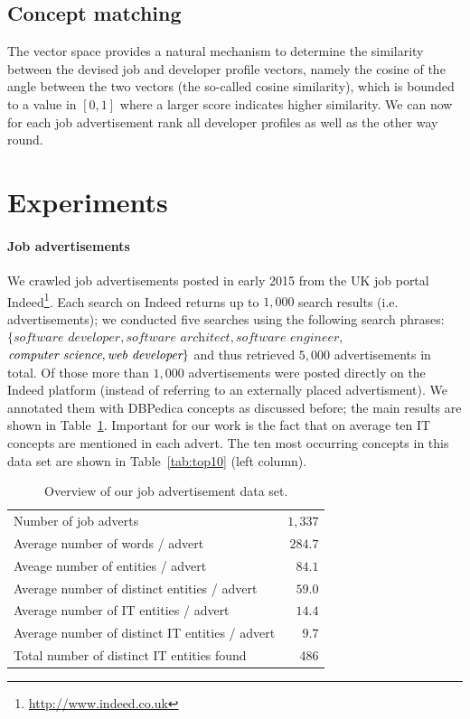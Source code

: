 \documentclass[conference]{IEEEtran}
\begin{document}
\subsection{Concept matching}

The vector space provides a natural mechanism to determine the similarity
between the devised job and developer profile vectors, namely the cosine of the
angle between the two vectors (the so-called cosine similarity), which is
bounded to a value in $[0,1]$ where a larger score indicates higher similarity.
We can now for each job advertisement rank all developer profiles as well as the
other way round.

\section{Experiments}

\paragraph{Job advertisements} 
We crawled job advertisements posted in early 2015 from the UK job portal  Indeed\footnote{\url{http://www.indeed.co.uk}}. Each search on Indeed returns up to $1,000$ search results (i.e. advertisements); we conducted five searches using the following search phrases: $\{\textit{software developer}, \textit{software architect}, \textit{software engineer},$ $\emph{computer science}, \emph{web developer}\}$ and thus retrieved $5,000$ advertisements in total. Of those more than $1,000$ advertisements were posted directly on the Indeed platform (instead of referring to an externally placed advertisment). We annotated them with DBPedica concepts as discussed before; the main results are shown in Table~\ref{tab:jobadverts}. Important for our work is the fact that on average ten IT concepts are mentioned in each advert. The ten most occurring concepts in this data set are shown in Table~\ref{tab:top10} (left column). 

\begin{table}
\centering
\begin{tabular}{lr}
\toprule
Number of job adverts								& $1,337$\\
Average number of words / advert 			& $284.7$\\
\midrule
Aveage number of entities / advert			& $84.1$\\
Average number of  distinct entities / advert	& $59.0$\\
\midrule
Average number of IT entities / advert	& $14.4$\\
Average number of distinct IT entities / advert& $9.7$\\
\midrule
Total number of distinct IT entities found	& 486\\
\bottomrule
\end{tabular}
\caption{Overview of our job advertisement data set.}
\label{tab:jobadverts}
\end{table}
\end{document}
